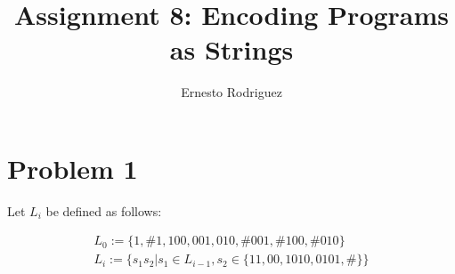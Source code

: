 \documentclass[11pt]{article}
\author{Ernesto Rodriguez}
\title{Assignment 8: Encoding Programs as Strings}
\begin{document}
\maketitle

\section{Problem 1}

Let $L_i$ be defined as follows:

\[
\begin{array}{l}
  L_0:=\{1,\#1,100,001,010,\#001,\#100,\#010\} \\
  L_i:=\{s_1s_2 | s_1 \in L_{i-1}, s_2 \in \{11,00,1010,0101,\#\}\}
\end{array}
\]
\end{document}
